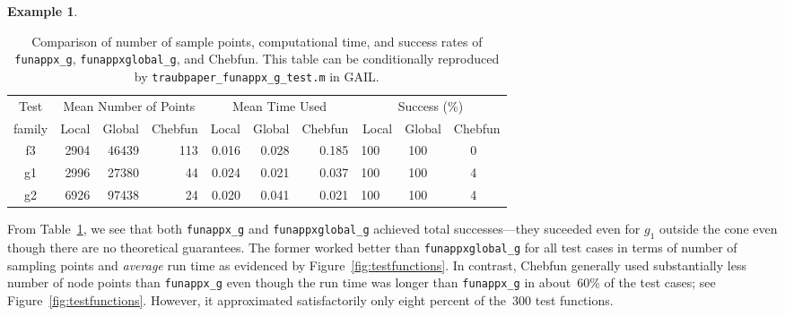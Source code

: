\documentclass[review]{elsarticle}
\theoremstyle{definition}
\newtheorem{exmp}{Example}
\newcommand{\funappxg}{\texttt{funappx\_g}\xspace}
\newcommand{\funappxglobalg}{\texttt{funappxglobal\_g\xspace}}
\begin{document}
\begin{exmp}
%
\begin{table}[bt]
\centering
\caption{Comparison of number of sample points, computational time,  and success
rates of \funappxg, \funappxglobalg, and Chebfun. 
This table can be conditionally reproduced by
\texttt{traubpaper\_funappx\_g\_test.m} in GAIL.}
\label{tab:localVsGlobalVsChebfun}
{\footnotesize
\setlength{\tabcolsep}{.5em} %
\begin{tabular}{|c|rrr|rrr|rrrrrr|}
\hline
    Test      &     \multicolumn{3}{c|}{Mean Number of Points} & \multicolumn{3}{c|}{Mean Time Used}  & \multicolumn{6}{|c|}{Success (\%)} 
\\  family &  Local  &  Global    &  Chebfun    & Local     &  Global     & Chebfun      & \multicolumn{2}{r}{Local} & \multicolumn{2}{r}{Global} & \multicolumn{2}{r|}{Chebfun}
\\ \hline
          f3   &   2904  &   46439   &   113    &   0.016   &     0.028    &   0.185 &    100   &    &  100   &   &  0   &     
\\        g1   &   2996  &   27380   &    44    &   0.024   &     0.021    &   0.037 &    100   &    &  100   &   &  4   &  
\\        g2   &   6926  &   97438   &    24    &   0.020   &     0.041    &   0.021 &    100   &    &  100   &   &  4   &          
\\ \hline	
\end{tabular}
}
\end{table}
%

From Table~\ref{tab:localVsGlobalVsChebfun}, we see that both \funappxg{} and
\funappxglobalg{} achieved total successes---they suceeded
even for  $g_1$ outside the cone even though there are no theoretical guarantees.
The former worked better than
\funappxglobalg{} for all test cases in terms of number of sampling points and
\emph{average} run time as evidenced by Figure~\ref{fig:testfunctions}.
In contrast, Chebfun generally used substantially less number of node points
than \funappxg{} even though the run time was longer than \funappxg{} in
about~60\% of the test cases; see Figure~\ref{fig:testfunctions}.
However, it approximated satisfactorily only eight percent of the~300 test
functions.



\end{exmp}
\end{document}
